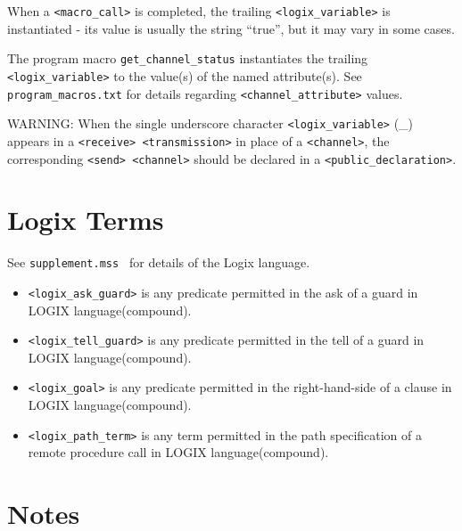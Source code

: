 \begin{itemize}
\noindent
When a \verb+<macro_call>+ is completed, the trailing \linebreak
\verb+<logix_variable>+ is instantiated - its value is usually the
string ``true'', but it may vary in some cases.

\noindent
The program macro \verb+get_channel_status+
instantiates the trailing \linebreak
\verb+<logix_variable>+ to the value(s) of the named attribute(s).  See 
\verb+program_macros.txt+ for details regarding
\verb+<channel_attribute>+ \linebreak values.

\noindent
WARNING: When the single underscore character \verb+<logix_variable>+
\linebreak (\_) appears
in a \verb+<receive> <transmission>+ in place of a \linebreak
\verb+<channel>+, the corresponding \verb+<send> <channel>+
should be declared in a \verb+<public_declaration>+.
\end{itemize}

\section{Logix Terms}
See \verb+supplement.mss + for details of the Logix language.

\begin{itemize}
\item
\verb+<logix_ask_guard>+ is any predicate permitted in the ask of a
guard in LOGIX language(compound).

\item
\verb+<logix_tell_guard>+ is any predicate permitted in the tell of a
guard in LOGIX language(compound).

\item
\verb+<logix_goal>+ is any predicate permitted in the right-hand-side
of a clause in LOGIX language(compound).

\item
\verb+<logix_path_term>+ is any term permitted in the path
specification of a remote procedure call in LOGIX language(compound).
\end{itemize}

\section{Notes}


